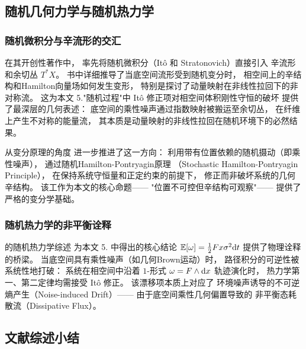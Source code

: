 ﻿\documentclass[10pt,a4paper]{article}
\begin{document}
\subsection{随机几何力学与随机热力学}

\subsubsection{随机微积分与辛流形的交汇}

\textcite{Bismut1981} 在其开创性著作中，
率先将随机微积分（It\^{o} 和 Stratonovich）直接引入
辛流形和余切丛 $T^*X$。
书中详细推导了当底空间流形受到随机变分时，
相空间上的辛结构和Hamilton向量场如何发生变形，
特别是探讨了动量映射在非线性拉回下的非对称流。
这为本文 5."随机过程"中
It\^{o} 修正项对相空间体积刚性守恒的破坏
提供了最深层的几何表述：
底空间的乘性噪声通过指数映射被搬运至余切丛，
在纤维上产生不对称的能量流，
其本质是动量映射的非线性拉回在随机环境下的必然结果。

\textcite{HolmTyranowski2016} 从变分原理的角度
进一步推进了这一方向：
利用带有位置依赖的随机摄动（即乘性噪声），
通过随机Hamilton-Pontryagin原理
（Stochastic Hamilton-Pontryagin Principle），
在保持系统守恒量和正定约束的前提下，
修正而非破坏系统的几何辛结构。
该工作为本文的核心命题——
"位置不可控但辛结构可观察"——
提供了严格的变分学基础。

\subsubsection{随机热力学的非平衡诠释}

\textcite{Seifert2012} 的随机热力学综述
为本文 5. 中得出的核心结论
$\mathbb E[\omega] = \frac{1}{2}Fx\sigma^2 \text dt$
提供了物理诠释的桥梁。
当底空间具有乘性噪声（如几何Brown运动）时，
路径积分的可逆性被系统性地打破：
系统在相空间中沿着 $1$-形式 $\omega = F \wedge \text dx$
轨迹演化时，
热力学第一、第二定律均需接受 It\^{o} 修正。
该漂移项本质上对应了
环境噪声诱导的不可逆熵产生（Noise-induced Drift）——
由于底空间乘性几何偏置导致的
非平衡态耗散流（Dissipative Flux）。

\subsection{文献综述小结}
\end{document}
